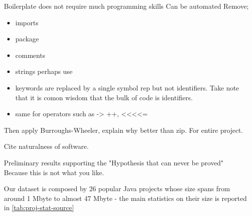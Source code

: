 Boilerplate does not require much programming skills
Can be automated 
Remove;
\begin{itemize}
\item imports
\item package
\item comments
\item strings perhaps use
\item keywords are replaced by a single symbol rep 
but not identifiers. Take note that it is comon wisdom that the bulk of code is identifiers.
\item same for operators such as -> ++, <<<<= 
\end{itemize}

Then apply Burroughs-Wheeler, explain why better than zip.
For entire project.

Cite naturalness of software.

Preliminary results supporting the 
"Hypothesis that can never be proved"
Because this is not what you like.

Our dataset is composed by 26 popular Java projects whose size spans from around 1 Mbyte to almost 47 Mbyte - 
the main statistics on their size is reported in \ref{tab:proj-stat-source}

\begin{table}
\centering
{}
\label{tab:proj-stat-source}
\caption{The results of the compression using the Burroughs-Wheeler algorithm.}
\end{table}

\begin{table*}
\centering
{}
\label{tab:proj-stat-original}
\caption{The results of the compression using the Jack algorithm alone and both Jack and 
Burroughs-Wheeler algorithms combined.}
\end{table*}

